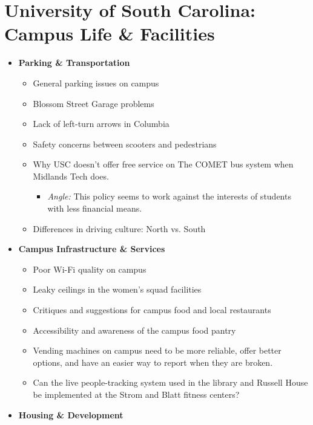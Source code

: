 \documentclass{article}
\begin{document}
\section*{University of South Carolina: Campus Life \& Facilities}

\begin{itemize}
\item
  \textbf{Parking \& Transportation}

  \begin{itemize}
  \item
    General parking issues on campus
  \item
    Blossom Street Garage problems
  \item
    Lack of left-turn arrows in Columbia
  \item
    Safety concerns between scooters and pedestrians
  \item
    Why USC doesn't offer free service on The COMET bus
    system when Midlands Tech does.

    \begin{itemize}
    \item
      \emph{Angle:} This policy seems to work against the interests of
      students with less financial means.
    \end{itemize}
  \item
    Differences in driving culture: North vs. South
  \end{itemize}
\item
  \textbf{Campus Infrastructure \& Services}

  \begin{itemize}
  \item
    Poor Wi-Fi quality on campus
  \item
    Leaky ceilings in the women's squad facilities
  \item
    Critiques and suggestions for campus food and local restaurants
  \item
    Accessibility and awareness of the campus food pantry
  \item
    Vending machines on campus need to be more reliable, offer better
    options, and have an easier way to report when they are broken.
  \item
    Can the live people-tracking system used in the library and Russell
    House be implemented at the Strom and Blatt fitness centers?
  \end{itemize}
\item
  \textbf{Housing \& Development}


\end{itemize}
\end{document}
